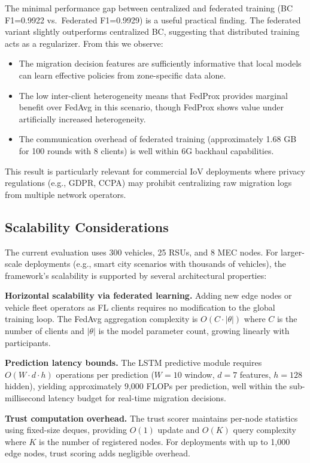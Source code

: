 \documentclass[10pt,letterpaper]{article}
\begin{document}
The minimal performance gap between centralized and federated training (BC F1=0.9922 vs.\ Federated F1=0.9929) is a useful practical finding. The federated variant slightly outperforms centralized BC, suggesting that distributed training acts as a regularizer. From this we observe:
\begin{itemize}
    \item The migration decision features are sufficiently informative that local models can learn effective policies from zone-specific data alone.
    \item The low inter-client heterogeneity means that FedProx provides marginal benefit over FedAvg in this scenario, though FedProx shows value under artificially increased heterogeneity.
    \item The communication overhead of federated training (approximately 1.68 GB for 100 rounds with 8 clients) is well within 6G backhaul capabilities.
\end{itemize}

This result is particularly relevant for commercial IoV deployments where privacy regulations (e.g., GDPR, CCPA) may prohibit centralizing raw migration logs from multiple network operators.

\subsection*{Scalability Considerations}

The current evaluation uses 300 vehicles, 25 RSUs, and 8 MEC nodes. For larger-scale deployments (e.g., smart city scenarios with thousands of vehicles), the framework's scalability is supported by several architectural properties:

\textbf{Horizontal scalability via federated learning.} Adding new edge nodes or vehicle fleet operators as FL clients requires no modification to the global training loop. The FedAvg aggregation complexity is $O(C \cdot |\theta|)$ where $C$ is the number of clients and $|\theta|$ is the model parameter count, growing linearly with participants.

\textbf{Prediction latency bounds.} The LSTM predictive module requires $O(W \cdot d \cdot h)$ operations per prediction ($W{=}10$ window, $d{=}7$ features, $h{=}128$ hidden), yielding approximately 9,000 FLOPs per prediction, well within the sub-millisecond latency budget for real-time migration decisions.

\textbf{Trust computation overhead.} The trust scorer maintains per-node statistics using fixed-size deques, providing $O(1)$ update and $O(K)$ query complexity where $K$ is the number of registered nodes. For deployments with up to 1,000 edge nodes, trust scoring adds negligible overhead.
\end{document}

